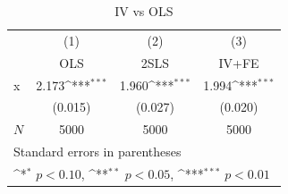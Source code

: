 \begin{table}[htbp]\centering
\def\sym#1{\ifmmode^{#1}\else\(^{#1}\)\fi}
\caption{IV vs OLS}
\begin{tabular}{l*{3}{c}}
\toprule
            &\multicolumn{1}{c}{(1)}&\multicolumn{1}{c}{(2)}&\multicolumn{1}{c}{(3)}\\
            &\multicolumn{1}{c}{OLS}&\multicolumn{1}{c}{2SLS}&\multicolumn{1}{c}{IV+FE}\\
\midrule
x           &       2.173\sym{***}&       1.960\sym{***}&       1.994\sym{***}\\
            &     (0.015)         &     (0.027)         &     (0.020)         \\
\midrule
\(N\)       &        5000         &        5000         &        5000         \\
\bottomrule
\multicolumn{4}{l}{\footnotesize Standard errors in parentheses}\\
\multicolumn{4}{l}{\footnotesize \sym{*} \(p<0.10\), \sym{**} \(p<0.05\), \sym{***} \(p<0.01\)}\\
\end{tabular}
\end{table}
